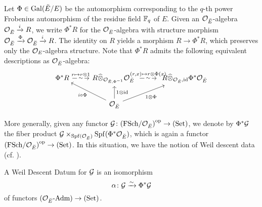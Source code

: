 \documentclass[../main.tex]{subfiles}
\begin{document}
Let $\Phi \in \operatorname{Gal}({\breve {E}} / E)$ be the automorphism corresponding to the
$q$-th power Frobenius automorphism of the residue field $\mathbb{F}_q$ of $E$. Given
an $\mathcal{O}_{\breve {E}}$-algebra $\mathcal{O}_{\breve {E}} \xrightarrow{i} R$, we write $\Phi^*R$ for the 
$\mathcal{O}_{\breve {E}}$-algebra with structure morphism $\mathcal{O}_{\breve {E}} \xrightarrow{\Phi} \mathcal{O}_{\breve {E}} \xrightarrow{i} R$.
The identity on $R$ yields a morphism $R \to \Phi^* R$, which preserves only the 
$\mathcal{O}_E$-algebra structure. Note that $\Phi^* R$ admits the following equivalent
descriptions as $\mathcal{O}_{\breve {E}}$-algebra:
\begin{equation}\label{eq:PhiRDescription}
\begin{tikzcd}[ampersand replacement=\&]
	{\Phi^*R} \& {R \cotimes_{\cO_{\br E, \Phi^{-1}}}\cO_{\br E} \ } \& {\ R \cotimes_{\cO_{\br E}, \id} \Phi^*\cO_{\br E}} \\
	\& {\cO_{\br E}}
	\arrow["{r \mapsto r \otimes 1}", draw=none, from=1-1, to=1-2]
	\arrow["\sim"{description}, from=1-1, to=1-2]
	\arrow["{(r,x) \mapsto r \otimes\Phi(x)}", draw=none, from=1-2, to=1-3]
	\arrow["\sim"{description}, from=1-2, to=1-3]
	\arrow["{i \circ \Phi}", from=2-2, to=1-1]
	\arrow["{1 \otimes \id}"', from=2-2, to=1-2]
	\arrow["{1 \otimes \Phi}"', from=2-2, to=1-3]
\end{tikzcd}
\end{equation}

More generally, given any functor $\mathcal{G} \colon {(\mathrm{FSch}/{\mathcal{O}_{\breve {E}}})}^{\mathrm{op}} \to
{(\mathrm{Set})}$, we denote by
$\Phi^* \mathcal{G}$ the fiber product $\mathcal{G} \times_{\operatorname{Spf}(\mathcal{O}_{\breve {E}})} \operatorname{Spf}(\Phi^*
\mathcal{O}_{\breve {E}})$, which is again a functor ${(\mathrm{FSch}/{\mathcal{O}_{\breve {E}}})}^{\mathrm{op}} \to {(\mathrm{Set})}$.
In this situation, we have the notion of Weil descent data
(cf. \cite[Definition 3.45]{rapoport1996period}).

\begin{defi}\label{def:WeilDescentDatum}
  A Weil Descent Datum for $\mathcal{G}$ is an isomorphism
  \begin{equation*}
    \alpha \colon \mathcal{G} \xrightarrow{\sim} \Phi^* \mathcal{G}
  \end{equation*}
  of functors ${({\mathcal{O}_{\breve {E}}}\text-\allowbreak\mathrm{Adm})} \to {(\mathrm{Set})}$.
\end{defi}
\end{document}
